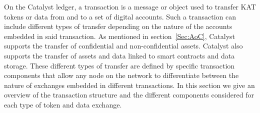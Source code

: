 On the Catalyst ledger, a transaction is a message or object used to transfer KAT tokens or data from and to a set of digital accounts. Such a transaction can include different types of transfer depending on the nature of the accounts embedded in said transaction. As mentioned in section~\ref{Sec:AoC}, Catalyst supports the transfer of confidential and non-confidential assets. Catalyst also supports the transfer of assets and data linked to smart contracts and data storage. These different types of transfer are defined by specific transaction components that allow any node on the network to differentiate between the nature of exchanges embedded in different transactions. In this section we give an overview of the transaction structure and the different components considered for each type of token and data exchange.
